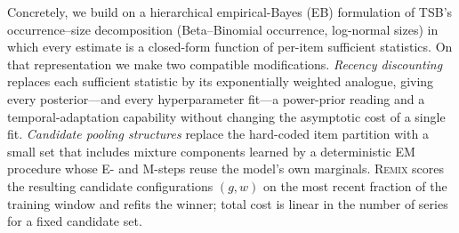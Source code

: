 \documentclass[twocolumn,10pt]{article}
\newcommand{\REMIX}{\textsc{Remix}}
\begin{document}
Concretely, we build on a hierarchical empirical-Bayes (EB) formulation of
TSB's occurrence--size decomposition (Beta--Binomial occurrence,
log-normal sizes) in which every estimate is a closed-form function of
per-item sufficient statistics. On that representation we make two
compatible modifications. \emph{Recency discounting} replaces each
sufficient statistic by its exponentially weighted analogue, giving every
posterior---and every hyperparameter fit---a power-prior reading and a
temporal-adaptation capability without changing the asymptotic cost of a
single fit. \emph{Candidate pooling structures} replace the hard-coded
item partition with a small set that includes mixture components learned
by a deterministic EM procedure whose E- and M-steps reuse the model's own
marginals. \REMIX{} scores the resulting candidate configurations
$(g,w)$ on the most recent fraction of the training window and refits the
winner; total cost is linear in the number of series for a fixed
candidate set.
\end{document}
